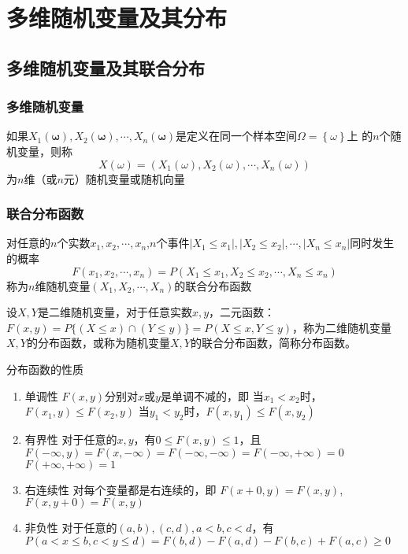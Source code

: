 \chapter{多维随机变量及其分布}
\section{多维随机变量及其联合分布}
\subsection{多维随机变量}
\begin{definition}
    如果$X_1(\boldsymbol{\omega}),X_2(\boldsymbol{\omega}),\cdots,X_n(\boldsymbol{\omega})$是定义在同一个样本空间$\Omega=\left\{\omega\right\}$上
    的$n$个随机变量，则称
    $$
        X(\omega)=(X_1(\omega),X_2(\omega),\cdots,X_n(\omega))
    $$
    为$n$维（或$n$元）随机变量或随机向量
\end{definition}
\subsection{联合分布函数}
\begin{definition}
    对任意的$n$个实数$x_1,x_2,\cdots,x_n$,$n$个事件$|X_1\leqslant x_1|,|X_2\leqslant x_2|,\cdots,| X_n\leqslant x_n|$同时发生的概率
    $$
        F(x_{1},x_{2},\cdots,x_{n})=P(X_{1}\leqslant x_{1},X_{2}\leqslant x_{2},\cdots,X_{n}\leqslant x_{n})
    $$
    称为$n$维随机变量$(X_1 ,X_2 ,\cdots,X_n)$的联合分布函数
\end{definition}


\begin{definition}[二维分布函数的定义]
    设$X,Y$是二维随机变量，对于任意实数$x,y$，二元函数：$F(x,y) = P\{ (X \le x) \cap (Y \le y)\}  = P( X \le x,Y \le y)$，称为二维随机变量$X,Y$的分布函数，或称为随机变量$X,Y$的联合分布函数，简称分布函数。
\end{definition}

\begin{property}分布函数的性质
    \begin{enumerate}
        \item 单调性 $F(x,y)$分别对$x$或$y$是单调不减的，即
              当$x_1 < x_2$时，$F(x_1,y) \le F(x_2,y)$
              当$y_1 < y_2$时，$F(x,y_1) \le F(x,y_2)$

        \item 有界性 对于任意的$x,y$，有$0 \le F(x,y) \le 1$，且
              $F(-\infty,y) = F(x,-\infty) = F(-\infty,-\infty) =F(-\infty,+\infty) = 0$
              $F(+\infty,+\infty) = 1$

        \item 右连续性 对每个变量都是右连续的，即
              $F(x+0,y) = F(x,y) $,$F(x,y+0) = F(x,y) $

        \item 非负性 对于任意的$(a,b),(c,d),a < b,c< d$，有$P(a < x \leq b,c < y \leq d)=F(b,d) - F(a,d) - F(b,c) + F(a,c) \ge 0$
    \end{enumerate}

\end{property}
